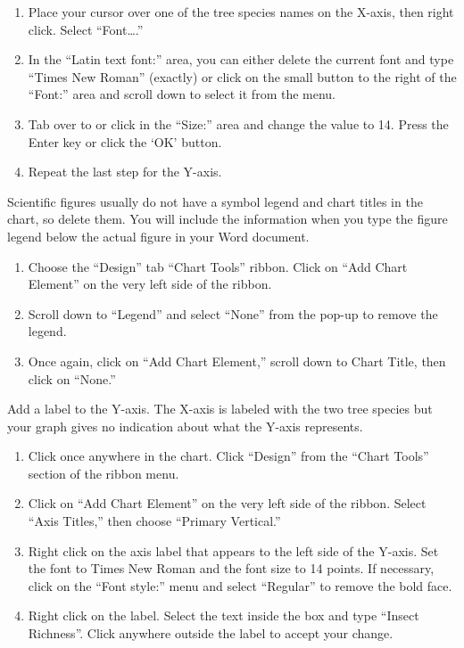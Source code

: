 \documentclass[12pt, hidelinks]{exam}
\begin{document}
\begin{enumerate}[resume]
	\item Place your cursor over one of the tree species names on the X-axis, then right click. Select “Font….”

	\item In the “Latin text font:” area, you can either delete the current font and type “Times New Roman” (exactly) or click on the small button to the right of the “Font:” area and scroll down to select it from the menu. 

	\item Tab over to or click in the “Size:” area and change the value to 14. Press the Enter key or click the ‘OK’ button.

	\item Repeat the last step for the Y-axis.
\end{enumerate}

Scientific figures usually do not have a symbol legend and chart titles in the chart, so delete them.  You will include the information when you type the figure legend below the actual figure in your Word document. 

\begin{enumerate}[resume]
	\item Choose the “Design” tab “Chart Tools” ribbon. Click on “Add Chart Element” on the very left side of the ribbon.  
	
	\item Scroll down to “Legend” and select “None” from the pop-up to remove the legend.
	
	\item Once again, click on “Add Chart Element,” scroll down to Chart Title, then click on “None.”

\end{enumerate}

Add a label to the Y-axis. The X-axis is labeled with the two tree species but your graph gives no indication about what the Y-axis represents.

\begin{enumerate}[resume]
	\item Click once anywhere in the chart. Click “Design” from the “Chart Tools” section of the ribbon menu. 

	\item Click on “Add Chart Element” on the very left side of the ribbon.  Select “Axis Titles,” then choose “Primary Vertical.”

	\item Right click on the axis label that appears to the left side of the Y-axis. Set the font to Times New Roman and the font size to 14 points. If necessary, click on the “Font style:” menu and select “Regular” to remove the bold face.

	\item Right click on the label. Select the text inside the box and type “Insect Richness”. Click anywhere outside the label to accept your change.
\end{enumerate}
\end{document}
